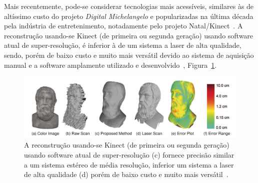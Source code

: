 Mais recentemente, pode-se considerar tecnologias mais acessíveis, similares às
de altíssimo custo do projeto \emph{Digital Michelangelo} e popularizadas na última
década pela indústria de entretenimento, notadamente pelo projeto
Natal/Kinect~\cite{smisek20133d,wang2015research}. A reconstrução usando-se Kinect (de
primeira ou segunda geração) usando software atual de super-resolução, é
inferior à de um sistema a laser de alta qualidade, sendo, porém de baixo custo
e muito mais versátil devido ao sistema de aquisição manual e a software
amplamente utilizado e desenvolvido~\cite{wang2015research},
Figura~\ref{fig:rec3d:comparacao}.


\begin{figure}[!h]
	\centering
	\includegraphics[width=1\linewidth]{figs/kinect-vs-usual.png}
	\caption{%
    A reconstrução usando-se Kinect (de primeira ou segunda geração) usando
    software atual de super-resolução (c) fornece precisão similar a um sistema estéreo de média
    resolução, inferior um sistema a laser de alta qualidade (d) porém de baixo custo e
    muito mais versátil~\cite{wang2015research}.
	}\label{fig:rec3d:comparacao}
\end{figure}

